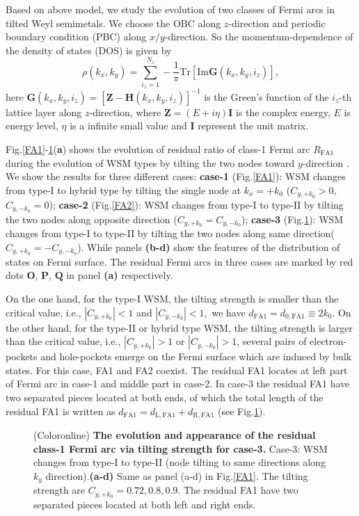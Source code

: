 \documentclass[twocolumn,superscriptaddress]{revtex4}%
\begin{document}
Based on above model, we study the evolution of two classes of Fermi arcs in tilted
Weyl semimetals. We choose the OBC along $z$-direction and periodic boundary
condition (PBC) along $x/y$-direction. So the momentum-dependence of the
density of states (DOS) is given by
\begin{equation}
\rho(k_{x},k_{y})=\sum_{i_{z}=1}^{N_{z}}-\frac{1}{\pi}\mathrm{Tr}%
[\mathrm{Im}\mathbf{G}(k_{x},k_{y},i_{z})],
\end{equation}
here $\mathbf{G}(k_{x},k_{y},i_{z})=[\mathbf{Z}-\mathbf{H}(k_{x},k_{y},i_{z})]^{-1}$ is the Green's function of the $i_{z}$-th lattice layer along $z$-direction, where $\mathbf{Z}=(E+i\eta)\mathbf{I}$ is the complex energy, $E$ is energy level, $\eta$ is a
infinite small value and $\mathbf{I}$ represent the unit matrix.

Fig.\ref{FA1}-\ref{FA3}(\textbf{a}) shows the evolution of residual ratio of class-1 Fermi arc
$R_{\mathrm{FA1}}$ during the evolution of WSM types by tilting the two nodes
toward $y$-direction . We show the results for three
different cases: \textbf{case-1} (Fig.\ref{FA1}): WSM changes from type-I to hybrid type by
tilting the single node at $k_{x}=+k_{0}$ ($C_{y,+k_{0}}>0$, $C_{y,-k_{0}}%
=0$); \textbf{case-2} (Fig.\ref{FA2}): WSM changes from type-I to type-II by tilting the two
nodes along opposite direction ($C_{y,+k_{0}}=C_{y,-k_{0}}$); \textbf{case-3} (Fig.\ref{FA3}):
WSM changes from type-I to type-II by tilting the two nodes along same
direction($C_{y,+k_{0}}=-C_{y,-k_{0}}$). While panels\textbf{ (b-d)} show the features of
the distribution of states on Fermi surface. The residual Fermi arcs in three cases are
marked by red dots $\mathbf{O}$, $\mathbf{P}$, $\mathbf{Q}$ in panel
\textbf{(a)} respectively.

On the one hand, for the type-I WSM, the tilting strength is smaller than the critical value,
i.e., $|C_{y,+k_{0}}|<1$ and $|C_{y,-k_{0}}|<1,$ we have $d_{\mathrm{FA1}}=d_{\mathrm{0,FA1}%
}\equiv2k_{0}$. On the other hand, for the type-II or hybrid type WSM, the tilting strength is larger than
the critical value, i.e., $|C_{y,+k_{0}}|>1$ or $|C_{y,-k_{0}}|>1$, several
pairs of electron-pockets and hole-pockets emerge on the Fermi surface which
are induced by bulk states. For this case, FA1 and FA2 coexist. The residual FA1 locates at left part of Fermi arc
in case-1 and middle part in case-2. In case-3 the residual FA1
have two separated pieces located at both ends, of which the total length of
the residual FA1 is written as $d_{\mathrm{FA1}}=d_{\mathrm{L,FA1}%
}+d_{\mathrm{R,FA1}}$ (see Fig.\ref{FA3}).
\begin{figure}[t]
\caption{(Coloronline) \textbf{The evolution and appearance of the residual class-1 Fermi arc via tilting strength for case-3.} Case-3: WSM changes from type-I to type-II (node tilting to same directions along $k_{y}$ direction).\textbf{(a-d)} Same as panel (a-d) in Fig.\ref{FA1}. The tilting strength are $C_{y,+k_{0}}=0.72,0.8,0.9$. The residual FA1 have two separated pieces located at both left and right ends.}%
\label{FA3}%
\end{figure}
\end{document}
